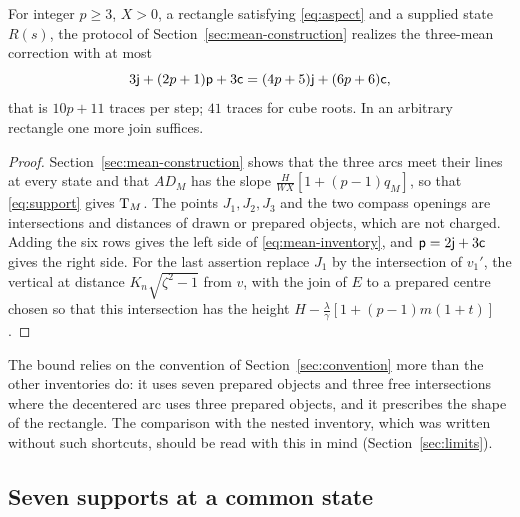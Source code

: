 \begin{proposition}\label{prop:mean-inventory}
For integer $p\ge3$, $X>0$, a rectangle satisfying \eqref{eq:aspect} and a supplied state $R(s)$, the
protocol of Section~\ref{sec:mean-construction} realizes the three-mean correction with at most
\begin{equation}\label{eq:mean-inventory}
3\mathsf{j}+(2p+1)\mathsf{p}+3\mathsf{c}=(4p+5)\mathsf{j}+(6p+6)\mathsf{c},
\end{equation}
that is $10p+11$ traces per step; $41$ traces for cube roots. In an arbitrary rectangle one more join
suffices.
\end{proposition}
\begin{proof}
Section~\ref{sec:mean-construction} shows that the three arcs meet their lines at every state and that
$AD_M$ has the slope $\tfrac{H}{WX}[1+(p-1)q_M]$, so that \eqref{eq:support} gives $\mathrm{T}_M$. The points
$J_1,J_2,J_3$ and the two compass openings are intersections and distances of drawn or prepared
objects, which are not charged. Adding the six rows gives the left side of
\eqref{eq:mean-inventory}, and $\mathsf{p}=2\mathsf{j}+3\mathsf{c}$ gives the right side. For the last assertion replace
$J_1$ by the intersection of $v_1'$, the vertical at distance $K_n\sqrt{\zeta^{2}-1}$ from $v$, with
the join of $E$ to a prepared centre chosen so that this intersection has the height
$H-\tfrac\lambda\gamma[1+(p-1)m(1+t)]$.
\end{proof}

The bound relies on the convention of Section~\ref{sec:convention} more than the other inventories do:
it uses seven prepared objects and three free intersections where the decentered arc uses three
prepared objects, and it prescribes the shape of the rectangle. The comparison with the nested
inventory, which was written without such shortcuts, should be read with this in mind
(Section~\ref{sec:limits}).

\subsection{Seven supports at a common state}

